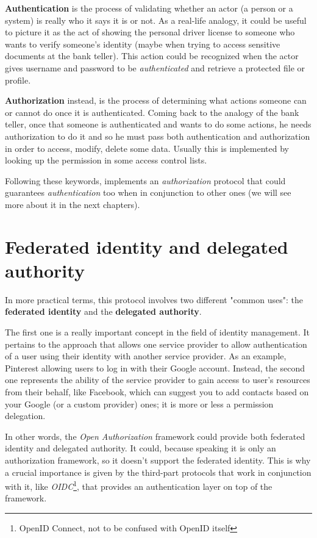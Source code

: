 \textbf{Authentication} is the process of validating whether an actor (a person or a system) is really who it says it is or not.
As a real-life analogy, it could be useful to picture it as the act of showing the personal driver license to someone who wants to verify someone's identity (maybe when trying to access sensitive documents at the bank teller). 
This action could be recognized when the actor gives username and password to be \textit{authenticated} and retrieve a protected file or profile.

\textbf{Authorization} instead, is the process of determining what actions someone can or cannot do once it is authenticated.
Coming back to the analogy of the bank teller, once that someone is authenticated and wants to do some actions, he needs authorization to do it and so he must pass both authentication and authorization in order to access, modify, delete some data. Usually this is implemented by looking up the permission in some access control lists.

Following these keywords, \textit{\oauth} implements an \textit{authorization} protocol that could guarantees \textit{authentication} too when in conjunction to other ones (we will see more about it in the next chapters).

\section{Federated identity and delegated authority}
In more practical terms, this protocol involves two different "common uses": the \textbf{federated identity} and the \textbf{delegated authority}.

The first one is a really important concept in the field of identity management. It pertains to the approach that allows one service provider to allow authentication of a user using their identity with another service provider. As an example, Pinterest allowing users to log in with their Google account.
Instead, the second one represents the ability of the service provider to gain access to user's resources from their behalf, like Facebook, which can suggest you to add contacts based on your Google (or a custom provider) ones; it is more or less a permission delegation.

In other words, the \textit{Open Authorization} framework could provide both federated identity and delegated authority. It could, because speaking it is only an authorization framework, so it doesn't support the federated identity. This is why a crucial importance is given by the third-part protocols that work in conjunction with it, like \textit{OIDC}\footnote{OpenID Connect, not to be confused with OpenID itself}, that provides an authentication layer on top of the \textit{\oauth} framework.

